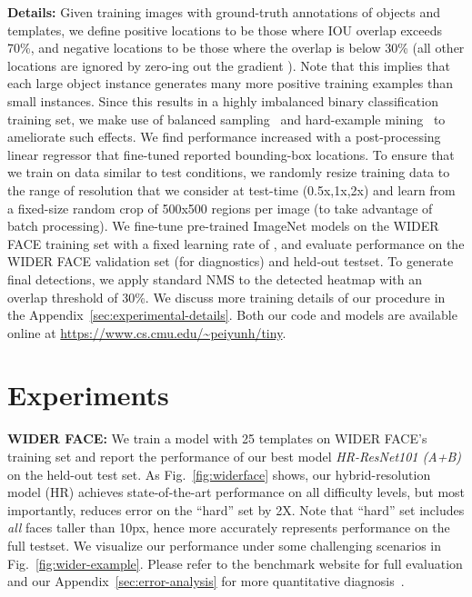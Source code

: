 \documentclass[10pt,twocolumn,letterpaper]{article}
\begin{document}
{\bf Details:} Given training images with ground-truth annotations of objects and templates, we define positive locations to be those where IOU overlap exceeds 70\%, and negative locations to be those where the overlap is below 30\% (all other locations are ignored by zero-ing out the gradient ). Note that this implies that each large object instance generates many more positive training examples than small instances. Since this results in a highly imbalanced binary classification training set, we make use of balanced sampling~\cite{girshick2014rich} and hard-example mining~\cite{shrivastava2016training} to ameliorate such effects. We find performance increased with a post-processing linear regressor that fine-tuned reported bounding-box locations. To ensure that we train on data similar to test conditions, we randomly resize training data to the range of  resolution that we consider at test-time (0.5x,1x,2x) and learn from a fixed-size random crop of 500x500 regions per image (to take advantage of batch processing). We fine-tune pre-trained ImageNet models on the WIDER FACE training set with a fixed learning rate of , and evaluate performance on the WIDER FACE validation set (for diagnostics) and held-out testset. To generate final detections, we apply standard NMS to the detected heatmap with an overlap threshold of 30\%. We discuss more training details of our procedure in the Appendix~\ref{sec:experimental-details}. Both our code and models are available online at {\small \url{https://www.cs.cmu.edu/~peiyunh/tiny}}. 










\section{Experiments}
\label{sec:exp}

{\bf WIDER FACE:} We train a model with 25 templates on WIDER FACE's training set and report the performance of our best model {\em HR-ResNet101 (A+B)} on the held-out test set. As Fig.~\ref{fig:widerface} shows, our hybrid-resolution model (HR) achieves state-of-the-art performance on all difficulty levels, but most importantly, reduces error on the ``hard'' set by 2X. Note that ``hard'' set includes {\em all} faces taller than 10px, hence more accurately represents performance on the full testset. We visualize our performance under some challenging scenarios in Fig.~\ref{fig:wider-example}. Please refer to the benchmark website for full evaluation and our Appendix~\ref{sec:error-analysis} for more quantitative diagnosis~\cite{hoiem2012diagnosing}.  
\end{document}
